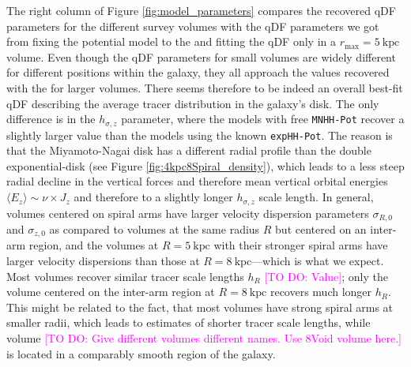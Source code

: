 \documentclass[iop,revtex4,numberedappendix,appendixfloats]{emulateapj}
\newcommand{\Wilma}[1]{\textcolor{Magenta}{#1}}
\begin{document}
The right column of Figure \ref{fig:model_parameters} compares the recovered qDF parameters for the different survey volumes with the qDF parameters we got from fixing the potential model to the  and fitting the qDF only in a $r_\text{max}=5~\text{kpc}$ volume. Even though the qDF parameters for small volumes are widely different for different positions within the galaxy, they all approach the values recovered with the  for larger volumes. There seems therefore to be indeed an overall best-fit qDF describing the average tracer distribution in the galaxy's disk. The only difference is in the $h_{\sigma,z}$ parameter, where the models with free \texttt{MNHH-Pot} recover a slightly larger value than the models using the known \texttt{expHH-Pot}. The reason is that the Miyamoto-Nagai disk has a different radial profile than the double exponential-disk (see Figure \ref{fig:4kpc8Spiral_density}), which leads to a less steep radial decline in the vertical forces and therefore mean vertical orbital energies $\langle E_z \rangle \sim \nu \times J_z$ and therefore to a slightly longer $h_{\sigma,z}$ scale length. In general, volumes centered on spiral arms have larger velocity dispersion parameters $\sigma_{R,0}$ and $\sigma_{z,0}$ as compared to volumes at the same radius $R$ but centered on an inter-arm region, and the volumes at $R=5~\text{kpc}$ with their stronger spiral arms have larger velocity dispersions than those at $R=8~\text{kpc}$---which is what we expect. Most volumes recover similar tracer scale lengths $h_R$ \Wilma{[TO DO: Value]}; only the volume centered on the inter-arm region at $R=8~\text{kpc}$ recovers much longer $h_R$. This might be related to the fact, that most volumes have strong spiral arms at smaller radii, which leads to estimates of shorter tracer scale lengths, while volume \Wilma{[TO DO: Give different volumes different names. Use 8Void volume here.]} is located in a comparably smooth region of the galaxy.
\end{document}
